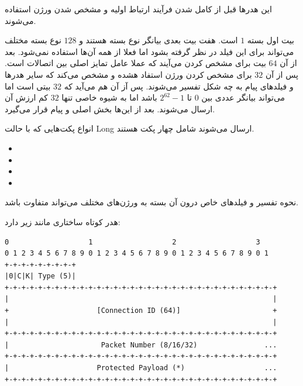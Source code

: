 \documentclass[12pt]{article}
\begin{document}
\begin{enumerate}
\begin{latin}
\begin{center}
\begin{Verbatim}
	\end{Verbatim}
	
\end{center}
\end{latin}

این هدرها قبل از کامل شدن فرآیند ارتباط اولیه و مشخص شدن ورژن استفاده می‌شوند.

 بیت اول بسته $1$ است. هفت بیت بعدی بیانگر نوع بسته هستند و $128$ نوع بسته مختلف می‌تواند برای این فیلد در نظر گرفته بشود اما فعلا از همه‌ آن‌ها استفاده نمی‌شود.  بعد از آن $64$ بیت برای مشخص کردن  می‌آیند که عملا عامل تمایز اصلی بین اتصالات است.
پس از آن $32$ برای مشخص کردن ورژن  استفاد هشده و مشخص می‌کند که سایر هدر‌ها و فیلدهای پیام به چه شکل تفسیر می‌شوند. پس آز آن هم  می‌آید که $32$ بیتی است اما می‌تواند بیانگر عددی بین $0$ تا $2^{62}-1$ باشد اما به شیوه خاصی تنها $32$ کم ارزش‌ آن ارسال می‌شوند. بعد از این‌ها بخش اصلی و  پیام قرار می‌گیرد.

انواع پکت‌هایی که با حالت Long ارسال می‌شوند شامل چهار پکت هستند.

\begin{latin}
\begin{itemize}
	\item {}
	
	\item {}
	
	
	\item {}
	
	
	\item {}
\end{itemize}
\end{latin}

نحوه تفسیر  و فیلد‌های خاص درون آن بسته به ورژن‌های مختلف  می‌تواند متفاوت باشد.
	
	
	هدر کوتاه ساختاری مانند زیر دارد:
	
	\begin{latin}
		\begin{center}
			\begin{Verbatim}
0                   1                   2                   3
0 1 2 3 4 5 6 7 8 9 0 1 2 3 4 5 6 7 8 9 0 1 2 3 4 5 6 7 8 9 0 1
+-+-+-+-+-+-+-+-+
|0|C|K| Type (5)|
+-+-+-+-+-+-+-+-+-+-+-+-+-+-+-+-+-+-+-+-+-+-+-+-+-+-+-+-+-+-+-+-+
|                                                               |
+                     [Connection ID (64)]                      +
|                                                               |
+-+-+-+-+-+-+-+-+-+-+-+-+-+-+-+-+-+-+-+-+-+-+-+-+-+-+-+-+-+-+-+-+
|                      Packet Number (8/16/32)                ...
+-+-+-+-+-+-+-+-+-+-+-+-+-+-+-+-+-+-+-+-+-+-+-+-+-+-+-+-+-+-+-+-+
|                     Protected Payload (*)                   ...
+-+-+-+-+-+-+-+-+-+-+-+-+-+-+-+-+-+-+-+-+-+-+-+-+-+-+-+-+-+-+-+-+


\end{Verbatim}
\end{center}
\end{latin}
\end{enumerate}
\end{document}
